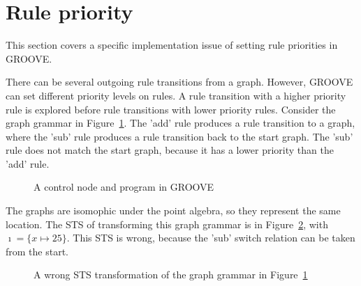 \section{Rule priority}
This section covers a specific implementation issue of setting rule priorities in GROOVE.

There can be several outgoing rule transitions from a graph. However, GROOVE can set different priority levels on rules. A rule transition with a higher priority rule is explored before rule transitions with lower priority rules. Consider the graph grammar in Figure~\ref{fig:priority_gg}. The 'add' rule produces a rule transition to a graph, where the 'sub' rule produces a rule transition back to the start graph. The 'sub' rule does not match the start graph, because it has a lower priority than the 'add' rule.

\begin{figure}[ht]
  \begin{center}
    \hspace{20px}
    \hspace{20px}
    \hspace{20px}
    \hspace{20px}
  \end{center}
  \caption{A control node and program in GROOVE}
  \label{fig:priority_gg}
\end{figure} 

The graphs are isomophic under the point algebra, so they represent the same location. The STS of transforming this graph grammar is in Figure~\ref{fig:priority_sts_wrong}, with $\imath = \{x \mapsto 25\}$. This STS is wrong, because the 'sub' switch relation can be taken from the start.

\begin{figure}[ht]
  \begin{center}
    
  \end{center}
  \caption{A wrong STS transformation of the graph grammar in Figure~\ref{fig:priority_gg}}
  \label{fig:priority_sts_wrong}
\end{figure}

